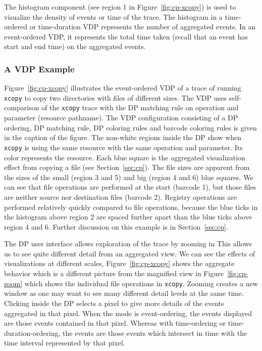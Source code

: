 The histogram component (see region 1 in Figure~\ref{fig:cp-xcopy})
is used to visualize the density of events or time
of the trace.
The histogram in a time-ordered or time-duration VDP
represents the number of aggregated events.
In an event-ordered VDP,
it represents the total time taken (recall that an event has start and end
time) on the aggregated events.

\subsubsection{A VDP Example}


Figure~\ref{fig:cp-xcopy} illustrates the event-ordered VDP
of a trace of running
{\tt xcopy} to copy two directories with files of different sizes.
The VDP uses self-comparison of the {\tt xcopy} trace with
the DP matching rule on operation and parameter (resource pathname).
The VDP configuration consisting of a DP ordering, DP matching rule,
DP coloring rules and barcode coloring rules
is given in the caption of the figure.
The non-white regions inside the DP show when {\tt xcopy} is using the
same resource with the same operation and parameter.
Its color represents the resource.
Each blue square is the aggregated visualization effect from
copying a file (see Section~\ref{sec:cp}).
The file sizes are apparent from the sizes of the small (region 3 and 5)
and big (region 4 and 6) blue squares.
We can see that file operations are performed at the start (barcode 1),
but those files are neither source nor destination files (barcode 2).
Registry operations are performed relatively
quickly compared to file operations,
because the blue ticks in the histogram above region 2 are spaced further apart
than the blue ticks above region 4 and 6.
Further discussion on this example is in Section~\ref{sec:cp}.

The DP user interface allows exploration of the trace by zooming in
This allows us to see quite different detail from an aggregated view.
We can see the effects of visualizations at different scales,
Figure~\ref{fig:cp-xcopy} shows the aggregate behavior which
is a different picture from the magnified view in
Figure~\ref{fig:cp-zoom} which shows the individual file operations in {\tt xcopy}.
Zooming creates a new window as one may want to see many different
detail levels at the same time. Clicking inside the DP selects
a pixel to give more details of the events aggregated in that pixel. When
the mode is event-ordering, the events displayed are those events contained
in that pixel. Whereas with time-ordering or time-duration-ordering,
the events are those events which intersect in time with the time interval
represented by that pixel.

